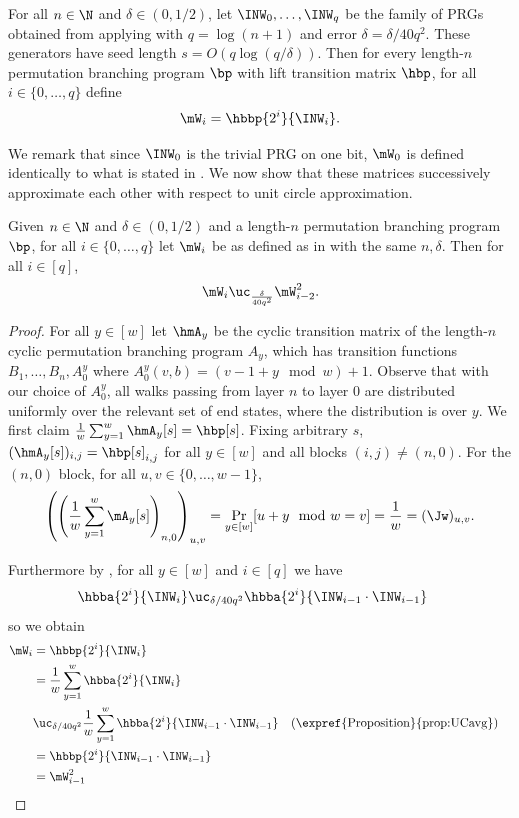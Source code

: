 \begin{definition}\label{def:basePRGfamily}
For all $n\in \N$ and $\delta\in (0,1/2)$, let $\INW_{0},\ldots,\INW_{q}$ be the family of PRGs obtained from applying  with $q=\log(n+1)$ and error $\delta=\delta/40q^2$. These generators have seed length $s=O(q\log(q/\delta))$. Then for every length-$n$ permutation branching program $\bp$ with lift transition matrix $\hbp$, for all $i\in\{0,\dots,q\}$ define
$$\mW_i = \hbbp{2^i}{\INW_i}.$$ 
\end{definition}
We remark that since $\INW_0$ is the trivial PRG on one bit, $\mW_0$ is defined identically to what is stated in . We now show that these matrices successively approximate each other with respect to unit circle approximation.

\begin{lemma}\label{lem:WsUC}
Given $n\in\N$ and $\delta\in(0,1/2)$ and a length-$n$ permutation branching program $\bp$, for all $i\in\{0,\dots,q\}$ let $\mW_i$ be as defined as in  with the same $n,\delta$. Then for all $i\in [q]$,
$$\mW_{i} \uc_{\frac{\delta}{40q^2}} \mW_{i-2}^2.$$
\end{lemma}

\begin{proof}
For all $y\in [w]$ let $\hmA_y$ be the cyclic transition matrix of the length-$n$ cyclic permutation branching program $A_y$, which has transition functions $B_1,\ldots,B_n,A^y_0$ where $A^y_{0}(v,b)=(v-1+y \mod w)+1$. Observe that with %
%
our
%
choice of $A^y_0$, all walks passing from layer $n$ to layer $0$ are distributed uniformly over the relevant set of end states, where the distribution is over $y$. We first claim $\frac{1}{w}\sum_{y=1}^w\hmA_y[s]=\hbp[s]$. Fixing arbitrary $s$, $(\hmA_y[s])_{i,j}=\hbp[s]_{i,j}$ for all $y\in [w]$ and all blocks $(i,j)\neq (n,0)$. For the $(n,0)$ block, for all $u,v\in \{0,\dots,w-1\}$,
$$\left(\left(\frac{1}{w}\sum_{y=1}^w\mA_y[s]\right)_{n,0}\right)_{u,v} = \Pr_{y\in[w]}[u+y \mod w =v] = \frac{1}{w}=(\Jw)_{u,v}.$$

Furthermore by , for all $y \in [w]$ and $i\in [q]$ we have 
\begin{align*}
     \hbba{2^{i}}{\INW_{i}}
    &\uc_{\delta/40q^2}\hbba{2^{i}}{\INW_{i-1}\cdot\INW_{i-1}}%
\end{align*}
%
so 
we obtain %
\begin{align*}
    \mW_i &= \hbbp{2^i}{\INW_i}\\ 
    &= \frac{1}{w}\sum_{y=1}^w\hbba{2^{i}}{\INW_{i}}\\
    &\uc_{\delta/40q^2}\frac{1}{w}\sum_{y=1}^w \hbba{2^{i}}{\INW_{i-1}\cdot\INW_{i-1}} && \text{(\expref{Proposition}{prop:UCavg})}\\
    &= \hbbp{2^i}{\INW_{i-1}\cdot\INW_{i-1}}\\ 
    &= \mW_{i-1}^2
    &&\qedhere
\end{align*}

\end{proof}

